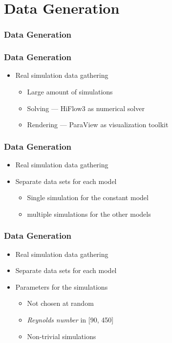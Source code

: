 \documentclass[18pt]{beamer}
\begin{document}
\section{Data Generation}

\begin{frame}[t]
  \frametitle{Data Generation}
\end{frame}

\begin{frame}[t]
  \frametitle{Data Generation}
  \begin{itemize}
  \item Real simulation data gathering
    \begin{itemize}
    \item Large amount of simulations
    \item Solving --- HiFlow3 as numerical solver
    \item Rendering --- ParaView as visualization toolkit
    \end{itemize}
  \end{itemize}
\end{frame}


\begin{frame}[t]
  \frametitle{Data Generation}
  \begin{itemize}
  \item Real simulation data gathering
  \item Separate data sets for each model
    \begin{itemize}
    \item Single simulation for the constant model
    \item multiple simulations for the other models
    \end{itemize}
  \end{itemize}
\end{frame}

\begin{frame}[t]
  \frametitle{Data Generation}
  \begin{itemize}
  \item Real simulation data gathering
  \item Separate data sets for each model
  \item Parameters for the simulations
    \begin{itemize}
    \item Not chosen at random
    \item \textit{Reynolds number} in [90, 450]
    \item Non-trivial simulations
    \end{itemize}
  \end{itemize}
\end{frame}
\end{document}
